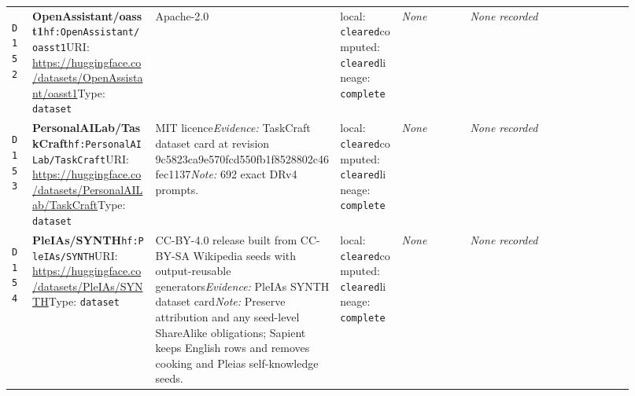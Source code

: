\documentclass[9pt,a4paper]{article}
\newcommand{\depid}[1]{\hypertarget{dep:#1}{\texttt{#1}}}
\begin{document}
\begin{landscape}
\begin{longtable}{@{}L{0.035\linewidth}L{0.185\linewidth}L{0.27\linewidth}L{0.09\linewidth}L{0.10\linewidth}L{0.24\linewidth}@{}}
\depid{D152} & \textbf{OpenAssistant/oasst1}\newline \nolinkurl{hf:OpenAssistant/oasst1}\newline URI: \url{https://huggingface.co/datasets/OpenAssistant/oasst1}\newline Type: \texttt{dataset} & Apache-2.0 & local: \texttt{cleared}\newline computed: \texttt{cleared}\newline lineage: \texttt{complete} & \textit{None} & \textit{None recorded} \\
\depid{D153} & \textbf{PersonalAILab/TaskCraft}\newline \nolinkurl{hf:PersonalAILab/TaskCraft}\newline URI: \url{https://huggingface.co/datasets/PersonalAILab/TaskCraft}\newline Type: \texttt{dataset} & MIT licence\newline \textit{Evidence:} TaskCraft dataset card at revision 9c5823ca9e570fcd550fb1f8528802c46fec1137\newline \textit{Note:} 692 exact DRv4 prompts. & local: \texttt{cleared}\newline computed: \texttt{cleared}\newline lineage: \texttt{complete} & \textit{None} & \textit{None recorded} \\
\depid{D154} & \textbf{PleIAs/SYNTH}\newline \nolinkurl{hf:PleIAs/SYNTH}\newline URI: \url{https://huggingface.co/datasets/PleIAs/SYNTH}\newline Type: \texttt{dataset} & CC-BY-4.0 release built from CC-BY-SA Wikipedia seeds with output-reusable generators\newline \textit{Evidence:} PleIAs SYNTH dataset card\newline \textit{Note:} Preserve attribution and any seed-level ShareAlike obligations; Sapient keeps English rows and removes cooking and Pleias self-knowledge seeds. & local: \texttt{cleared}\newline computed: \texttt{cleared}\newline lineage: \texttt{complete} & \textit{None} & \textit{None recorded} \\

\end{longtable}
\end{landscape}
\end{document}
